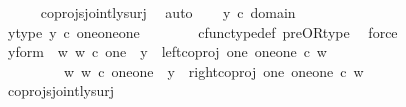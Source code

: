 \begin{isabellebody}
\ \ \ \ \isamarkupfalse%
\ coprojs{\isacharunderscore}{\kern0pt}jointly{\isacharunderscore}{\kern0pt}surj\ \isamarkupfalse%
\ auto\isanewline
\isanewline
\ \ \isamarkupfalse%
\ {\isachardoublequoteopen}y\ {\isasymin}\isactrlsub c\ domain\ {\isacharparenleft}{\kern0pt}{\isasymlangle}{\isasymt}{\isacharcomma}{\kern0pt}{\isasymt}{\isasymrangle}\ {\isasymamalg}\ {\isasymlangle}{\isasymt}{\isacharcomma}{\kern0pt}{\isasymf}{\isasymrangle}\ {\isasymamalg}\ {\isasymlangle}{\isasymf}{\isacharcomma}{\kern0pt}{\isasymt}{\isasymrangle}{\isacharparenright}{\kern0pt}{\isachardoublequoteclose}\ \isanewline
\ \ \isamarkupfalse%
\ \isamarkupfalse%
\ y{\isacharunderscore}{\kern0pt}type{\isacharcolon}{\kern0pt}\ {\isachardoublequoteopen}y\ {\isasymin}\isactrlsub c\ {\isacharparenleft}{\kern0pt}one{\isasymCoprod}{\isacharparenleft}{\kern0pt}one{\isasymCoprod}one{\isacharparenright}{\kern0pt}{\isacharparenright}{\kern0pt}{\isachardoublequoteclose}\ \ \isanewline
\ \ \ \ \isamarkupfalse%
\ cfunc{\isacharunderscore}{\kern0pt}type{\isacharunderscore}{\kern0pt}def\ pre{\isacharunderscore}{\kern0pt}OR{\isacharunderscore}{\kern0pt}type\ \isamarkupfalse%
\ force\isanewline
\ \ \isamarkupfalse%
\ \isamarkupfalse%
\ y{\isacharunderscore}{\kern0pt}form{\isacharcolon}{\kern0pt}\ {\isachardoublequoteopen}{\isacharparenleft}{\kern0pt}{\isasymexists}\ w{\isachardot}{\kern0pt}\ {\isacharparenleft}{\kern0pt}w\ {\isasymin}\isactrlsub c\ one\ {\isasymand}\ y\ {\isacharequal}{\kern0pt}\ {\isacharparenleft}{\kern0pt}left{\isacharunderscore}{\kern0pt}coproj\ one\ {\isacharparenleft}{\kern0pt}one{\isasymCoprod}one{\isacharparenright}{\kern0pt}{\isacharparenright}{\kern0pt}\ {\isasymcirc}\isactrlsub c\ w{\isacharparenright}{\kern0pt}{\isacharparenright}{\kern0pt}\isanewline
\ \ \ \ \ \ {\isasymor}\ \ {\isacharparenleft}{\kern0pt}{\isasymexists}\ w{\isachardot}{\kern0pt}\ {\isacharparenleft}{\kern0pt}w\ {\isasymin}\isactrlsub c\ {\isacharparenleft}{\kern0pt}one{\isasymCoprod}one{\isacharparenright}{\kern0pt}\ {\isasymand}\ y\ {\isacharequal}{\kern0pt}\ {\isacharparenleft}{\kern0pt}right{\isacharunderscore}{\kern0pt}coproj\ one\ {\isacharparenleft}{\kern0pt}one{\isasymCoprod}one{\isacharparenright}{\kern0pt}{\isacharparenright}{\kern0pt}\ {\isasymcirc}\isactrlsub c\ w{\isacharparenright}{\kern0pt}{\isacharparenright}{\kern0pt}{\isachardoublequoteclose}\isanewline
\ \ \ \ \isamarkupfalse%
\ coprojs{\isacharunderscore}{\kern0pt}jointly{\isacharunderscore}{\kern0pt}surj\ \isamarkupfalse%

\end{isabellebody}
